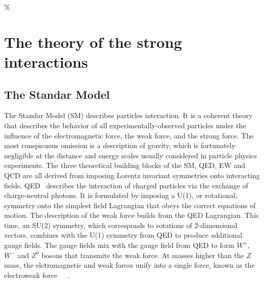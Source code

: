 \%
%
%
\chapter{The theory of the strong interactions}

\section{The Standar Model}\label{sec:qcdintro}

The Standar Model (SM) describes particles interaction. It is a coherent theory that describes the behavior of all experimentally-observed particles under the influence of the electromagnetic force, the weak force, and the strong force.
The most conspicuous omission is a description of gravity, which is fortunately negligible at the distance and energy  scales usually considered in particle physics experiments.
The three theoretical building blocks of the SM, QED, EW and QCD are all derived from imposing Lorentz invariant symmetries onto interacting fields.
QED~\cite{PhysRev.75.486} describes the interaction of charged particles via the exchange of charge-neutral photons. It is formulated by imposing a U(1), or rotational, symmetry onto the simplest field Lagrangian that obeys the correct equations of motion. %
The description of the weak force builds from the QED Lagrangian. This time, an SU(2) symmetry, which corresponds to rotations of 2-dimensional vectors, combines with the U(1) symmetry from QED to produce additional gauge fields. The gauge fields mix with the gauge field from QED to form $W^+$, $W^-$ and $Z^0$ bosons that transmite the weak force. %
At masses higher than the $Z$ mass, the elctromagnetic and weak forces unify into a single force, known as the electroweak force~\cite{Glashow1961579}~\cite{Salam1964168}~\cite{PhysRevLett.19.1264}.


